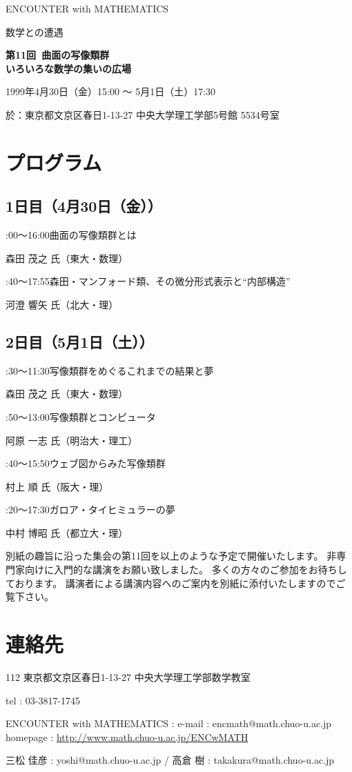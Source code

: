\documentclass[uplatex,dvipdfmx]{jlreq}
\newcommand{\talk}[3]{%
\noindent
#1\quad #2\par
\hspace*{2em}#3\par\smallskip
}
\newcommand{\EwMnumber}{第11回}
\newcommand{\EwMtitle}{曲面の写像類群\\[2mm]\large いろいろな数学の集いの広場}
\newcommand{\EwMdate}{1999年4月30日（金）15:00 ～ 5月1日（土）17:30}
\newcommand{\EwMplace}{東京都文京区春日1-13-27 中央大学理工学部5号館 5534号室}
\newcommand{\EwMtitleblock}{

\vspace*{-5mm}

\begin{center}

{\Large ENCOUNTER with MATHEMATICS}

\vspace{2mm}

{\large 数学との遭遇}

\vspace{4mm}

{\Large \bfseries \EwMnumber\ \EwMtitle}

\vspace{4mm}

\EwMdate

\vspace{2mm}

於：\EwMplace

\end{center}

\vspace{2mm}

}
\begin{document}
\EwMtitleblock


\section*{プログラム}

\subsection*{1日目（4月30日（金））}

\talk
{15:00～16:00}
{曲面の写像類群とは}
{森田 茂之 氏（東大・数理）}

\talk
{16:40～17:55}
{森田・マンフォード類、その微分形式表示と“内部構造”}
{河澄 響矢 氏（北大・理）}

\subsection*{2日目（5月1日（土））}

\talk
{10:30～11:30}
{写像類群をめぐるこれまでの結果と夢}
{森田 茂之 氏（東大・数理）}

\talk
{11:50～13:00}
{写像類群とコンピュータ}
{阿原 一志 氏（明治大・理工）}

\talk
{14:40～15:50}
{ウェブ図からみた写像類群}
{村上 順 氏（阪大・理）}

\talk
{16:20～17:30}
{ガロア・タイヒミュラーの夢}
{中村 博昭 氏（都立大・理）}


\bigskip

別紙の趣旨に沿った集会の第11回を以上のような予定で開催いたします。  
非専門家向けに入門的な講演をお願い致しました。  
多くの方々のご参加をお待ちしております。  
講演者による講演内容へのご案内を別紙に添付いたしますのでご覧下さい。


\section*{連絡先}

112 東京都文京区春日1-13-27 中央大学理工学部数学教室  

tel : 03-3817-1745  

ENCOUNTER with MATHEMATICS : e-mail : encmath@math.chuo-u.ac.jp  
homepage : \url{http://www.math.chuo-u.ac.jp/ENCwMATH}  

三松 佳彦 : yoshi@math.chuo-u.ac.jp / 高倉 樹 : takakura@math.chuo-u.ac.jp
\end{document}
